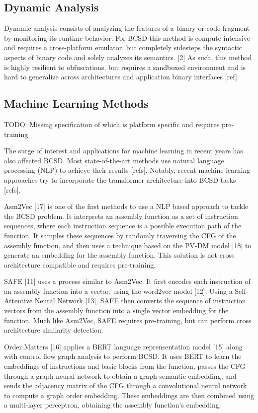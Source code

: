 \documentclass[conference,compsoc]{IEEEtran}
\begin{document}
\subsection{Dynamic Analysis}

Dynamic analysis consists of analyzing the features of a binary or code fragment by monitoring its runtime behavior. For BCSD
this method is compute intensive and requires a cross-platform emulator, but completely sidesteps the syntactic aspects of binary code
and solely analyzes its semantics. [2] As such, this method is highly resilient to obfuscations, but requires a sandboxed environment
and is hard to generalize across architectures and application binary interfaces [ref].

\subsection{Machine Learning Methods}

TODO: Missing specification of which is platform specific and requires pre-training

The surge of interest and applications for machine learning in recent years has also affected BCSD.
Most state-of-the-art methods use natural language processing (NLP) to achieve their results [refs].
Notably, recent machine learning approaches try to incorporate the transformer architecture into BCSD tasks [refs].

Asm2Vec [17] is one of the first methods to use a NLP based approach to tackle the BCSD problem. It interprets an
assembly function as a set of instruction sequences, where each instruction sequence is a possible execution path
of the function. It samples these sequences by randomly traversing the CFG of the assembly function, and then
uses a technique based on the PV-DM model [18] to generate an embedding for the assembly function. This solution
is not cross architecture compatible and requires pre-training.

SAFE [11] uses a process similar to Asm2Vec. It first encodes each instruction of an assembly function into a vector,
using the word2vec model [12]. Using a Self-Attentive Neural Network [13], SAFE then converts the sequence of instruction
vectors from the assembly function into a single vector embedding for the function. Much like Asm2Vec, SAFE requires
pre-training, but can perform cross architecture similarity detection.

Order Matters [16] applies a BERT language reprensentation model [15] along with control flow graph analysis
to perform BCSD. It uses BERT to learn the embeddings of instructions and basic blocks from the function,
passes the CFG through a graph neural network to obtain a graph semantic embedding, and sends the adjacency
matrix of the CFG through a convolutional neural network to compute a graph order embedding. These embeddings
are then combined using a multi-layer perceptron, obtaining the assembly function's embedding. 
\end{document}
